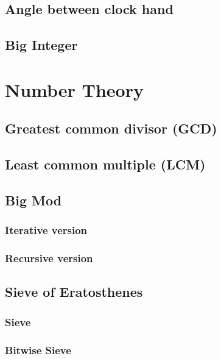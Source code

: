 \documentclass[11pt]{report}
\begin{document}
\section{Angle between clock hand}

\section{Big Integer}


\chapter{Number Theory}
\section{Greatest common divisor (GCD)}

\section{Least common multiple (LCM)}

\section{Big Mod}
\subsection{Iterative version}

\subsection{Recursive version}

\section{Sieve of Eratosthenes}
\subsection{Sieve}

\subsection{Bitwise Sieve}

\end{document}
